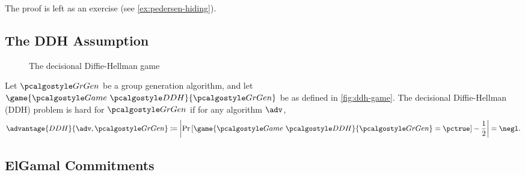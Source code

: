 The proof is left as an exercise (see \autoref{ex:pedersen-hiding}).

\subsection{The DDH Assumption}

\begin{figure}[tbhp]
  \begin{center}
    \begin{tcolorbox}[width=6cm]
      \begin{pchstack}[center]
      \end{pchstack}
    \end{tcolorbox}
  \end{center}
  \caption{The decisional Diffie-Hellman game\label{fig:ddh-game}}
\end{figure}

\begin{definition}
  Let $\grgen$ be a group generation algorithm, and let $\game{\Game~\algo{DDH}}{\grgen}$ be as defined in \autoref{fig:ddh-game}.
  The decisional Diffie-Hellman (DDH) problem is hard for $\grgen$ if for any \ppt algorithm $\adv$,
  \[
  \advantage{DDH}{\adv, \grgen} \defeq \left|\pr{\game{\Game~\algo{DDH}}{\grgen} = \pctrue} - \frac{1}{2}\right| = \negl.
  \]
\end{definition}

\subsection{ElGamal Commitments}

